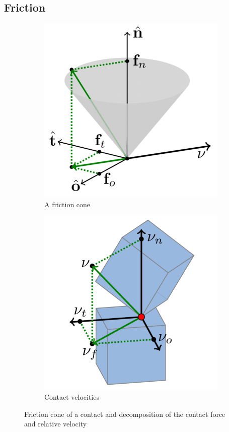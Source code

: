 \subsection{Friction}
\begin{figure}[htp]
\center
\begin{subfigure}[b]{0.45\textwidth}
	\includegraphics[width=\textwidth]{figures/friction_cone}
	\caption{A friction cone}
	\label{fig:friction_cone}
\end{subfigure}
\hfill
\begin{subfigure}[b]{0.47\textwidth}
	\includegraphics[width=\textwidth]{figures/friction_cube}
	\caption{Contact velocities}
	\label{fig:friction_cube}
\end{subfigure}
\caption[Friction cone and relative velocities]{Friction cone of a contact and decomposition of the contact force and relative velocity}
\label{fig:ph}
\end{figure}
